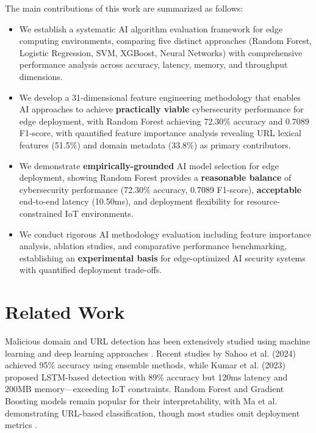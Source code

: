 \documentclass[conference]{IEEEtran}
\begin{document}
The main contributions of this work are summarized as follows:
\begin{itemize}
  \item We establish a systematic AI algorithm evaluation framework for edge computing environments, comparing five distinct approaches (Random Forest, Logistic Regression, SVM, XGBoost, Neural Networks) with comprehensive performance analysis across accuracy, latency, memory, and throughput dimensions.
  \item We develop a 31-dimensional feature engineering methodology that enables AI approaches to achieve \textbf{practically viable} cybersecurity performance for edge deployment, with Random Forest achieving 72.30\% accuracy and 0.7089 F1-score, with quantified feature importance analysis revealing URL lexical features (51.5\%) and domain metadata (33.8\%) as primary contributors.
  \item We demonstrate \textbf{empirically-grounded} AI model selection for edge deployment, showing Random Forest provides a \textbf{reasonable balance} of cybersecurity performance (72.30\% accuracy, 0.7089 F1-score), \textbf{acceptable} end-to-end latency (10.50ms), and deployment flexibility for resource-constrained IoT environments.
  \item We conduct rigorous AI methodology evaluation including feature importance analysis, ablation studies, and comparative performance benchmarking, establishing an \textbf{experimental basis} for edge-optimized AI security systems with quantified deployment trade-offs.
\end{itemize}

\section{Related Work}

Malicious domain and URL detection has been extensively studied using machine learning and deep learning approaches \cite{ref_phishtank,ref_lexical_features,ref_url_features}. Recent studies by Sahoo et al. (2024) \cite{ref_malurl_2024} achieved 95\% accuracy using ensemble methods, while Kumar et al. (2023) \cite{ref_phishing_lstm_2023} proposed LSTM-based detection with 89\% accuracy but 120ms latency and 200MB memory—exceeding IoT constraints. Random Forest \cite{ref_dns_detection} and Gradient Boosting models remain popular for their interpretability, with Ma et al. \cite{ref_rf_security} demonstrating URL-based classification, though most studies omit deployment metrics \cite{ref_phishing_detection}.
\end{document}
